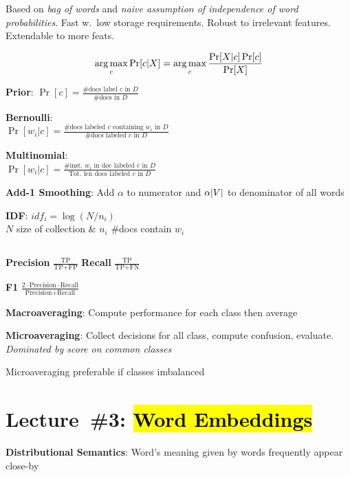\documentclass[9pt]{extarticle}
\renewcommand{\green}[1]{{\color{ForestGreen} #1}}
\newcommand{\greenbf}[1]{\textbf{\green{#1}}}
\begin{document}
\begin{multicols}{3}
  Based on \textit{bag of words} and \textit{naive assumption of independence of word probabilities}. Fast w.\ low storage requirements. Robust to irrelevant features. Extendable to more feats.

  \begin{equation*}\label{eq:L02:NaiveBayes}
    \operatorname*{arg\,max}_c \Pr\lbrack c \vert X\rbrack = \operatorname*{arg\,max}_{c} \frac{\Pr[X \vert c] \Pr[c]}{\Pr[X]}
  \end{equation*}

  \greenbf{Prior}: $\Pr[c] = \frac{\text{\#docs label } c \text{ in } D}{\text{\#docs in } D}$

  \greenbf{Bernoulli}: \\ $\Pr[w_ i \vert c] = \frac{\text{\# docs labeled } c \text{ containing } w_i \text{ in } D}{\text{\#docs labeled } c \text{ in } D}$

  \greenbf{Multinomial}: \\ $\Pr[w_i \vert c] = \frac{\text{\# inst.\ } w_i \text{ in doc labeled } c \text{ in } D}{\text{Tot.\ len docs labeled } c \text{ in } D}$

  \greenbf{Add-1 Smoothing}: Add $\alpha$ to numerator and $\alpha\lvert V\rvert$ to denominator of all words

  \greenbf{IDF}: $idf_i = \log \left(N/n_i\right)$ \\ $N$ size of collection \& $n_i$ \#docs contain $w_i$

  \subsection*{}

  \greenbf{Precision} $\frac{\text{TP}}{\text{TP} + \text{FP}}$ \hspace{0.1cm} \greenbf{Recall} $\frac{\text{TP}}{\text{TP} + \text{FN}}$

  \greenbf{F1} $\frac{2 \cdot \text{Precision} \cdot \text{Recall}}{\text{Precision} + \text{Recall}}$

  \greenbf{Macroaveraging}: Compute performance for each class then average

  \greenbf{Microaveraging}: Collect decisions for all class, compute confusion, evaluate. \textit{Dominated by score on common classes}

  Microaveraging preferable if classes imbalanced

  \section*{Lecture~\#3: \hl{Word Embeddings}}
  \greenbf{Distributional Semantics}: Word's meaning given by words frequently appear close-by


\end{multicols}
\end{document}
